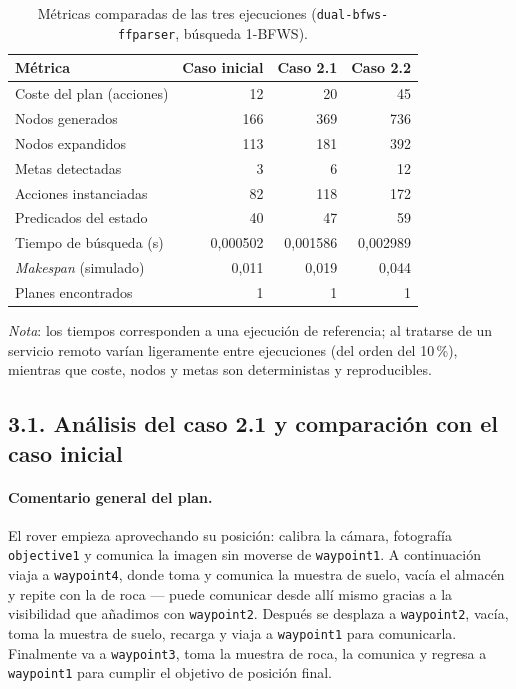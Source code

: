 \documentclass[12pt,a4paper]{article}
\begin{document}
\begin{table}[H]
\centering
\caption{M\'etricas comparadas de las tres ejecuciones
(\texttt{dual-bfws-ffparser}, b\'usqueda 1-BFWS).}
\label{tab:metricas}
\small
\begin{tabular}{lrrr}
\toprule
\textbf{M\'etrica} & \textbf{Caso inicial} & \textbf{Caso 2.1} & \textbf{Caso 2.2} \\
\midrule
Coste del plan (acciones)      & 12       & 20       & 45       \\
Nodos generados                & 166      & 369      & 736      \\
Nodos expandidos               & 113      & 181      & 392      \\
Metas detectadas               & 3        & 6        & 12       \\
Acciones instanciadas          & 82       & 118      & 172      \\
Predicados del estado          & 40       & 47       & 59       \\
Tiempo de b\'usqueda (s)        & 0,000502 & 0,001586 & 0,002989 \\
\emph{Makespan} (simulado)     & 0,011    & 0,019    & 0,044    \\
Planes encontrados             & 1        & 1        & 1        \\
\bottomrule
\end{tabular}

\vspace{0.4em}
{\footnotesize\emph{Nota}: los tiempos corresponden a una ejecuci\'on de
referencia; al tratarse de un servicio remoto var\'ian ligeramente entre
ejecuciones (del orden del 10\,\%), mientras que coste, nodos y metas son
deterministas y reproducibles.}
\end{table}

\subsection{3.1. An\'alisis del caso 2.1 y comparaci\'on con el caso inicial}

\paragraph{Comentario general del plan.}
El rover empieza aprovechando su posici\'on: calibra la c\'amara, fotograf\'ia
\texttt{objective1} y comunica la imagen sin moverse de \texttt{waypoint1}.
A continuaci\'on viaja a \texttt{waypoint4}, donde toma y comunica la muestra
de suelo, vac\'ia el almac\'en y repite con la de roca --- puede comunicar
desde all\'i mismo gracias a la visibilidad que a\~nadimos con
\texttt{waypoint2}. Despu\'es se desplaza a \texttt{waypoint2}, vac\'ia,
toma la muestra de suelo, recarga y viaja a \texttt{waypoint1} para
comunicarla. Finalmente va a \texttt{waypoint3}, toma la muestra de roca, la
comunica y regresa a \texttt{waypoint1} para cumplir el objetivo de posici\'on
final.
\end{document}
